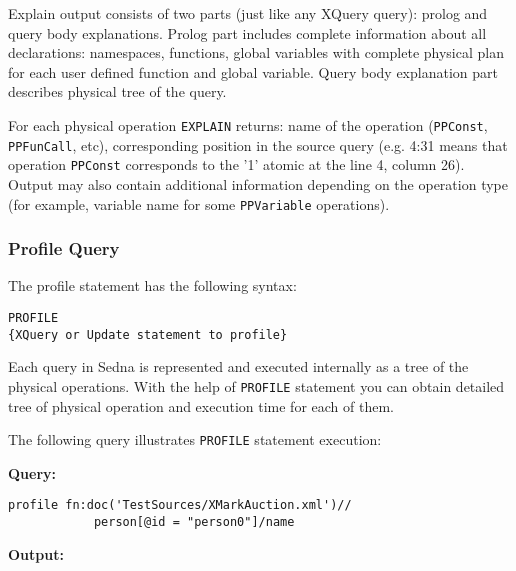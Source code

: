 \documentclass[a4paper,12pt]{article}
\begin{document}
Explain output consists of two parts (just like any XQuery query): prolog and
query body explanations. Prolog part includes complete information about all
declarations: namespaces, functions, global variables with complete physical
plan for each user defined function and global variable. Query body explanation
part describes physical tree of the query.

For each physical operation \verb!EXPLAIN! returns: name of the operation
(\verb!PPConst!, \verb!PPFunCall!, etc), corresponding position in the source
query (e.g. 4:31 means that operation \verb!PPConst! corresponds to the '1'
atomic at the line 4, column 26). Output may also contain additional information
depending on the operation type (for example, variable name for some
\verb!PPVariable! operations).


\subsubsection{Profile Query}
\label{profile}

The profile statement has the following syntax:
\begin{verbatim}
PROFILE
{XQuery or Update statement to profile}
\end{verbatim}
Each query in Sedna is represented and executed internally as a tree of the
physical operations. With the help of \verb!PROFILE! statement you can obtain
detailed tree of physical operation and execution time for each of them.

\medskip
\noindent
The following query illustrates \verb!PROFILE! statement execution:

\medskip
\noindent
\textbf{Query:}
\begin{verbatim}
profile fn:doc('TestSources/XMarkAuction.xml')//
            person[@id = "person0"]/name
\end{verbatim}

\medskip
\noindent
\textbf{Output:}
\end{document}
